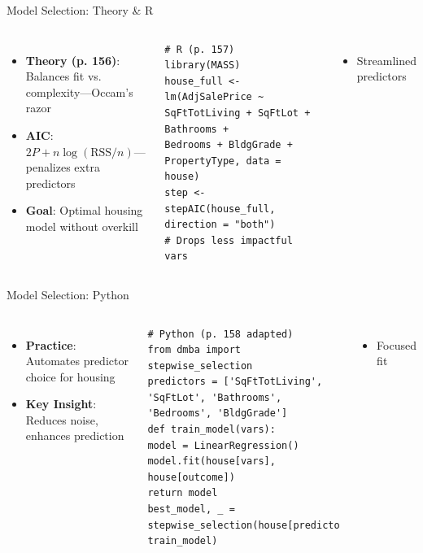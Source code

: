 \documentclass{beamer}
\begin{document}
	\begin{frame}[fragile]{Model Selection: Theory \& R}
		\begin{columns}
			\begin{itemize}
				\item \textbf{Theory (p. 156)}: Balances fit vs. complexity—Occam’s razor
				\item \textbf{AIC}: $2P + n\log(\text{RSS}/n)$—penalizes extra predictors
				\item \textbf{Goal}: Optimal housing model without overkill
			\end{itemize}
			\begin{lstlisting}
# R (p. 157)
library(MASS)
house_full <- lm(AdjSalePrice ~ SqFtTotLiving + SqFtLot + Bathrooms +
Bedrooms + BldgGrade + PropertyType, data = house)
step <- stepAIC(house_full, direction = "both")
# Drops less impactful vars
			\end{lstlisting}
			\begin{itemize}
				\item Streamlined predictors
			\end{itemize}
		\end{columns}
	\end{frame}
	
	\begin{frame}[fragile]{Model Selection: Python}
		\lstset{language=Python}
		\begin{columns}
			\column{0.6\textwidth}
			\begin{itemize}
				\item \textbf{Practice}: Automates predictor choice for housing
				\item \textbf{Key Insight}: Reduces noise, enhances prediction
			\end{itemize}
			\begin{lstlisting}
# Python (p. 158 adapted)
from dmba import stepwise_selection
predictors = ['SqFtTotLiving', 'SqFtLot', 'Bathrooms', 'Bedrooms', 'BldgGrade']
def train_model(vars):
model = LinearRegression()
model.fit(house[vars], house[outcome])
return model
best_model, _ = stepwise_selection(house[predictors].columns, train_model)
			\end{lstlisting}
			\column{0.4\textwidth}
			\begin{itemize}
				\item Focused fit
			\end{itemize}
		\end{columns}
	\end{frame}
	
\end{document}
